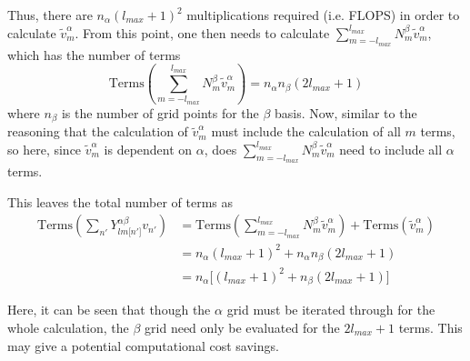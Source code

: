\documentclass{revtex4-1}
\begin{document}
Thus, there are $n_{\alpha}\left(l_{max}+1\right)^{2}$ multiplications required (i.e. FLOPS) in order to calculate $\tilde{v}_{m}^{\alpha}$. From this point, one then needs to calculate $\sum_{m=-l_{max}}^{l_{max}}N_{m}^{\beta}\tilde{v}_{m}^{\alpha}$, which has the number of terms
\begin{equation}\label{E:GaussQuadLinRotPotPartSumOutSum}
\mbox{Terms}\!\left(\sum_{m=-l_{max}}^{l_{max}}N_{m}^{\beta}\tilde{v}_{m}^{\alpha}\right) = n_{\alpha}n_{\beta}\left(2l_{max}+1\right)
\end{equation}
where $n_{\beta}$ is the number of grid points for the $\beta$ basis. Now, similar to the reasoning that the calculation of $\tilde{v}_{m}^{\alpha}$ must include the calculation of all $m$ terms, so here, since $\tilde{v}_{m}^{\alpha}$ is dependent on $\alpha$, does $\sum_{m=-l_{max}}^{l_{max}}N_{m}^{\beta}\tilde{v}_{m}^{\alpha}$ need to include all $\alpha$ terms.

This leaves the total number of terms as
\begin{align}
\mbox{Terms}\!\left(\sum_{n'}Y_{lm\lbrack n'\rbrack}^{\alpha\beta}v_{n'}\right) 	&= \mbox{Terms}\!\left(\sum_{m=-l_{max}}^{l_{max}}N_{m}^{\beta}\tilde{v}_{m}^{\alpha}\right) + \mbox{Terms}\!\left(\tilde{v}_{m}^{\alpha}\right) \\
																				&= n_{\alpha}\left(l_{max}+1\right)^{2} + n_{\alpha}n_{\beta}\left(2l_{max}+1\right)\\
																				&= n_{\alpha}\lbrack\left(l_{max}+1\right)^{2} + n_{\beta}\left(2l_{max}+1\right)\rbrack
\end{align}

Here, it can	be seen that though the $\alpha$ grid must be iterated through for the whole calculation, the $\beta$ grid need only be evaluated for the $2l_{max}+1$ terms. This may give a potential computational cost savings.
													
\end{document}
